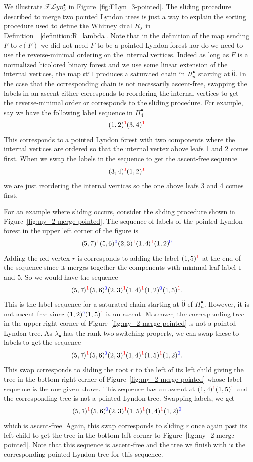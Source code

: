 \documentclass[11pt]{article}
\theoremstyle{definition}
\numberwithin{equation}{section}
\newcommand{\Flyn}{\mathcal{FL}yn}
\newcommand{\tre}[1]{{\color{red}{#1}}}
\newcommand{\tbl}[1]{{\color{blue}{#1}}}
\begin{document}
We illustrate $\Flyn_{3}^{\bullet}$ in Figure~\ref{fig:FLyn_3-pointed}.    The sliding procedure described to merge two pointed Lyndon trees is just a way to explain the sorting procedure used to define the Whitney dual $R_\lambda$ in Definition~~\ref{definition:R_lambda}.   Note that in the definition of the map sending $F$ to $c(F)$ we did not need $F$ to be a pointed Lyndon forest nor do we need to use the reverse-minimal ordering on the internal vertices. Indeed as long as $F$ is a normalized bicolored binary forest and we use some linear extension of the internal vertices, the map still produces a saturated chain in $\Pi_n^\bullet$ starting at $\hat{0}$. In the case that the corresponding chain is not necessarily ascent-free, swapping the labels in an ascent either corresponds to reordering the internal vertices to get the reverse-minimal order or corresponds to the sliding procedure.  For example, say we have the following label sequence in $\Pi_4^\bullet$
$$
(1,2)^{\tre{1}}(3,4)^{\tre{1}}
$$
This corresponds to a pointed Lyndon forest with two components where the internal vertices are ordered so that the internal vertex above leafs 1 and 2 comes first.  When we swap the labels in the sequence to get the ascent-free sequence  
$$
(3,4)^{\tre{1}}(1,2)^{\tre{1}}
$$
we are just reordering the internal vertices so the one above leafs 3 and 4  comes first. 

For an example where sliding occurs, consider the sliding procedure shown in Figure~\ref{fig:my_2-merge-pointed}.  The sequence of labels of the pointed Lyndon  forest in the upper left corner of the figure is 
$$
(5,7)^{\tre{1}}(5,6)^{\tbl{0}}(2,3)^{\tre{1}}(1,4)^{\tre{1}}(1,2)^{\tbl{0}}
$$
Adding the red vertex $r$ is corresponds to adding the  label $(1,5)^{\tre{1}}$ at the end of the sequence since it merges together the components with minimal leaf label $1$ and $5$.  So we would have the sequence
$$
(5,7)^{\tre{1}}(5,6)^{\tbl{0}}(2,3)^{\tre{1}}(1,4)^{\tre{1}}(1,2)^{\tbl{0}}(1,5)^{\tre{1}}.
$$
This is the label sequence for a saturated chain starting at $\hat{0}$ of $\Pi_n^\bullet$.  However, it is not ascent-free since $(1,2)^{\tbl{0}}(1,5)^{\tre{1}}$ is an ascent. Moreover, the corresponding tree in the upper right corner of Figure~\ref{fig:my_2-merge-pointed} is not a pointed Lyndon tree. As $\lambda_\bullet$ has the rank two switching property, we can swap these to labels to get the sequence
$$
(5,7)^{\tre{1}}(5,6)^{\tbl{0}}(2,3)^{\tre{1}}(1,4)^{\tre{1}}(1,5)^{\tre{1}}(1,2)^{\tbl{0}}.
$$
This swap corresponds to sliding the root $r$ to the left of its left child giving the tree in the bottom right corner of Figure~\ref{fig:my_2-merge-pointed} whose label sequence is the one given above.  This sequence has an ascent at $(1,4)^{\tre{1}}(1,5)^{\tre{1}}$ and the corresponding tree is not a pointed Lyndon tree. Swapping labels, we  get
$$
(5,7)^{\tre{1}}(5,6)^{\tbl{0}}(2,3)^{\tre{1}}(1,5)^{\tre{1}}(1,4)^{\tre{1}}(1,2)^{\tbl{0}}
$$
which is ascent-free. Again, this swap corresponds to sliding $r$ once again past its left child to get the tree in the bottom left corner to Figure~\ref{fig:my_2-merge-pointed}.  Note that this sequence is ascent-free and the tree we finish with is the corresponding pointed Lyndon tree for this sequence.
\end{document}
